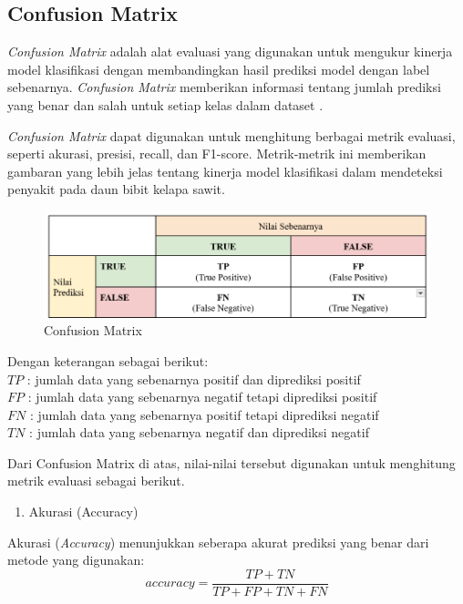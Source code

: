 \subsection{Confusion Matrix} \label{II. ConfusionMatrix}
\textit{Confusion Matrix} adalah alat evaluasi yang digunakan untuk mengukur kinerja model klasifikasi dengan membandingkan hasil prediksi model dengan label sebenarnya. \textit{Confusion Matrix} memberikan informasi tentang jumlah prediksi yang benar dan salah untuk setiap kelas dalam dataset \cite{rijal2024deteksi}.

\textit{Confusion Matrix} dapat digunakan untuk menghitung berbagai metrik evaluasi, seperti akurasi, presisi, recall, dan F1-score. Metrik-metrik ini memberikan gambaran yang lebih jelas tentang kinerja model klasifikasi dalam mendeteksi penyakit pada daun bibit kelapa sawit.

\begin{figure}[H]
	\centering
	\includegraphics[width=1\textwidth]{figure/chapter-2-Confusion-Matrix.png}
	\caption{Confusion Matrix}
	\label{fig:2.ConfusionMatrix}
\end{figure}
Dengan keterangan sebagai berikut:\\[0.5em]
\hspace*{2em}$TP$ : jumlah data yang sebenarnya positif dan diprediksi positif\\
\hspace*{2em}$FP$ : jumlah data yang sebenarnya negatif tetapi diprediksi positif\\
\hspace*{2em}$FN$ : jumlah data yang sebenarnya positif tetapi diprediksi negatif\\
\hspace*{2em}$TN$ : jumlah data yang sebenarnya negatif dan diprediksi negatif

Dari Confusion Matrix di atas, nilai-nilai tersebut digunakan untuk menghitung metrik evaluasi sebagai berikut.


\begin{enumerate}
	\item {Akurasi (Accuracy)}\label{II.Ekstraksi Fitur Tekstur.Kontras}
\end{enumerate}
Akurasi (\textit{Accuracy}) menunjukkan seberapa akurat prediksi yang benar dari metode yang digunakan:
\begin{equation}
    accuracy = \frac{TP + TN}{TP + FP + TN + FN}
    \label{eq:accuracy}
\end{equation}

